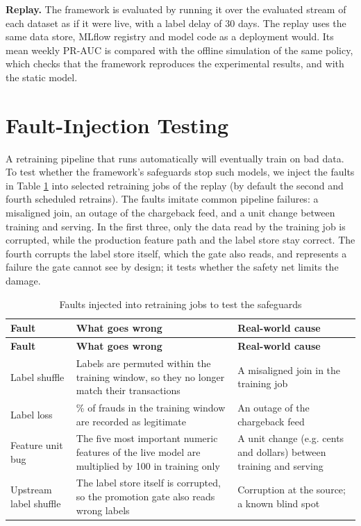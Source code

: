 \textbf{Replay.} The framework is evaluated by running it over the evaluated stream of each dataset as if it were live, with a label delay of 30 days. The replay uses the same data store, MLflow registry and model code as a deployment would. Its mean weekly PR-AUC is compared with the offline simulation of the same policy, which checks that the framework reproduces the experimental results, and with the static model.

\section{Fault-Injection Testing}

A retraining pipeline that runs automatically will eventually train on bad data. To test whether the framework's safeguards stop such models, we inject the faults in Table \ref{tab:faults} into selected retraining jobs of the replay (by default the second and fourth scheduled retrains). The faults imitate common pipeline failures: a misaligned join, an outage of the chargeback feed, and a unit change between training and serving. In the first three, only the data read by the training job is corrupted, while the production feature path and the label store stay correct. The fourth corrupts the label store itself, which the gate also reads, and represents a failure the gate cannot see by design; it tests whether the safety net limits the damage.

{\footnotesize
\begin{longtable}{>{\raggedright\arraybackslash}p{}>{\raggedright\arraybackslash}p{}>{\raggedright\arraybackslash}p{}}
\caption{Faults injected into retraining jobs to test the safeguards}\label{tab:faults}\\
\toprule
\textbf{Fault} & \textbf{What goes wrong} & \textbf{Real-world cause} \\
\midrule
\endfirsthead
\toprule
\textbf{Fault} & \textbf{What goes wrong} & \textbf{Real-world cause} \\
\midrule
\endhead
Label shuffle & Labels are permuted within the training window, so they no longer match their transactions & A misaligned join in the training job \\ \midrule
Label loss & 80\% of frauds in the training window are recorded as legitimate & An outage of the chargeback feed \\ \midrule
Feature unit bug & The five most important numeric features of the live model are multiplied by 100 in training only & A unit change (e.g. cents and dollars) between training and serving \\ \midrule
Upstream label shuffle & The label store itself is corrupted, so the promotion gate also reads wrong labels & Corruption at the source; a known blind spot \\ \bottomrule
\end{longtable}
}

